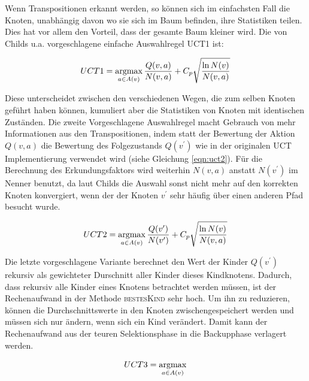 Wenn Transpositionen erkannt werden, so können sich im einfachsten Fall die Knoten, unabhängig davon wo sie sich im Baum befinden, ihre Statistiken teilen. Dies hat vor allem den Vorteil, dass der gesamte Baum kleiner wird. Die von Childs u.a. vorgeschlagene einfache Auswahlregel UCT1 ist:

\begin{equation}
UCT1 = \operatorname*{argmax}_{a \in A(v)} \frac{Q(v,a)}{N(v,a)} + C_p\sqrt{\frac{\ln N(v)}{N(v,a)}}
\label{eqn:UCT1}
\end{equation}

Diese unterscheidet zwischen den verschiedenen Wegen, die zum selben Knoten geführt haben können, kumuliert aber die Statistiken von Knoten mit identischen Zuständen. Die zweite Vorgeschlagene Auswahlregel macht Gebrauch von mehr Informationen aus den Transpositionen, indem statt der Bewertung der Aktion $Q(v,a)$ die Bewertung des Folgezustands $Q(v^\prime)$ wie in der originalen UCT Implementierung verwendet wird (siehe Gleichung \ref{eqn:uct2}). Für die Berechnung des Erkundungsfaktors wird weiterhin $N(v,a)$ anstatt $N(v^\prime)$ im Nenner benutzt, da laut Childs die Auswahl sonst nicht mehr auf den korrekten Knoten konvergiert, wenn der der Knoten $v^\prime$ sehr häufig über einen anderen Pfad besucht wurde.

\begin{equation}
UCT2 = \operatorname*{argmax}_{a \in A(v)} \frac{Q(v^\prime)}{N(v^\prime)} + C_p\sqrt{\frac{\ln N(v)}{N(v,a)}}
\label{eqn:UCT2}
\end{equation}

Die letzte vorgeschlagene Variante berechnet den Wert der Kinder $Q(v^\prime)$ rekursiv als gewichteter Durschnitt aller Kinder dieses Kindknotens. Dadurch, dass rekursiv alle Kinder eines Knotens betrachtet werden müssen, ist der Rechenaufwand in der Methode \textsc{bestesKind} sehr hoch. Um ihn zu reduzieren, können die Durchschnittswerte in den Knoten zwischengespeichert werden und müssen sich nur ändern, wenn sich ein Kind verändert. Damit kann der Rechenaufwand aus der teuren Selektionsphase in die Backupphase verlagert werden.

\begin{equation}
UCT3 = \operatorname*{argmax}_{a \in A(v)}
\label{eqn:uct3}
\end{equation}

